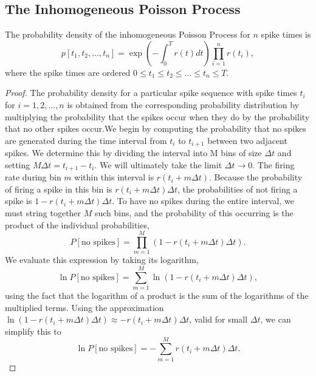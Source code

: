 \subsection{The Inhomogeneous Poisson Process}
\begin{thm}
  The probability density of the inhomogeneous Poisson Process for $n$ spike times is 
  \begin{equation}
    p[t_1, t_2, ..., t_n]=\exp\left(-\int^T_0r(t)dt\right)\prod^n_{i=1}r(t_i),
    \label{equ:1.37}
  \end{equation}
  where the spike times are ordered $0\leq t_1 \leq t_2\leq ... \leq t_n \leq T$.
  \begin{proof}
    The probability density for a particular spike sequence with spike times $t_i$ for $i = 1, 2, ..., n$ is obtained from the corresponding probability distribution by multiplying the probability that the spikes occur when they do by the probability that no other spikes occur.We begin by computing the probability that no spikes are generated during the time interval from $t_i$ to $t_{i+1}$ between two adjacent spikes. We determine this by dividing the interval into M bins of size $\Delta t$ and setting $M\Delta t=t_{i+1}-t_i$. We will ultimately take the limit $\Delta t\to 0$. The firing rate during bin $m$ within this interval is $r(t_i+m\Delta t)$. Because the probability of firing a spike in this bin is $r(t_i+m\Delta t)\Delta t$, the probabilities of not firing a spike is $1-r(t_i+m\Delta t)\Delta t$. To have no spikes during the entire interval, we must string together $M$ such bins,  and the probability of this occurring is the product of the individual probabilities, 
    \begin{equation}
      P[\text{no spikes}]=\prod_{m=1}^M(1-r(t_i+m\Delta t)\Delta t).
      \label{equ:1.52}
    \end{equation}
    We evaluate this expression by taking its logarithm,             
    \begin{equation}
      \ln P[\text{no spikes}]=\sum_{m=1}^M\ln(1-r(t_i+m\Delta t)\Delta t),
      \label{equ:1.53}
    \end{equation}
    using the fact that the logarithm of a product is the sum of the logarithms of the multiplied terms. Using the approximation $\ln (1-r(t_i+m\Delta t)\Delta t)\approx -r(t_i+m\Delta t)\Delta t$,  valid for small $\Delta t$, we can simplify this to 
    \begin{equation}
      \ln P[\text{no spikes}]=-\sum_{m=1}^Mr(t_i+m\Delta t)\Delta t.
      \label{equ:1.54}
    \end{equation}

\end{proof}
\end{thm}
